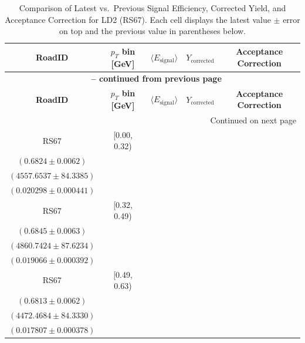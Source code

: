 {\footnotesize
\renewcommand{\arraystretch}{1.35}
\begin{longtable}{|c|c|c|c|c|}
\caption{Comparison of Latest vs.\ Previous Signal Efficiency, Corrected Yield, and Acceptance Correction for LD2 (RS67). Each cell displays the latest value $\pm$ error on top and the previous value in parentheses below.} \label{tab:eff_acc_comp_LD2_RS67} \\
\hline
\textbf{RoadID} & \textbf{$p_{T}$ bin [GeV]} & \textbf{$\langle E_{\mathrm{signal}} \rangle$} & \textbf{$Y_{\mathrm{corrected}}$} & \textbf{Acceptance Correction} \\
\hline
\endfirsthead
\multicolumn{5}{c}{{\bfseries \tablename\ \thetable{} -- continued from previous page}} \\
\hline
\textbf{RoadID} & \textbf{$p_{T}$ bin [GeV]} & \textbf{$\langle E_{\mathrm{signal}} \rangle$} & \textbf{$Y_{\mathrm{corrected}}$} & \textbf{Acceptance Correction} \\
\hline
\endhead
\hline \multicolumn{5}{|r|}{{Continued on next page}} \\ \hline
\endfoot
\hline
\endlastfoot
RS67 & [0.00, 0.32) & \begin{tabular}{@{}c@{}}$0.7383 \pm 0.0044$ \\ $(0.6824 \pm 0.0062)$\end{tabular} & \begin{tabular}{@{}c@{}}$4144.5377 \pm 77.2141$ \\ $(4557.6537 \pm 84.3385)$\end{tabular} & \begin{tabular}{@{}c@{}}$0.018992 \pm 0.000431$ \\ $(0.020298 \pm 0.000441)$\end{tabular} \\ \hline
RS67 & [0.32, 0.49) & \begin{tabular}{@{}c@{}}$0.7406 \pm 0.0044$ \\ $(0.6845 \pm 0.0063)$\end{tabular} & \begin{tabular}{@{}c@{}}$4400.6172 \pm 80.1012$ \\ $(4860.7424 \pm 87.6234)$\end{tabular} & \begin{tabular}{@{}c@{}}$0.018741 \pm 0.000389$ \\ $(0.019066 \pm 0.000392)$\end{tabular} \\ \hline
RS67 & [0.49, 0.63) & \begin{tabular}{@{}c@{}}$0.7356 \pm 0.0044$ \\ $(0.6813 \pm 0.0062)$\end{tabular} & \begin{tabular}{@{}c@{}}$4053.8929 \pm 77.2620$ \\ $(4472.4684 \pm 84.3330)$\end{tabular} & \begin{tabular}{@{}c@{}}$0.017840 \pm 0.000378$ \\ $(0.017807 \pm 0.000378)$\end{tabular} \\ \hline

\end{longtable}}
